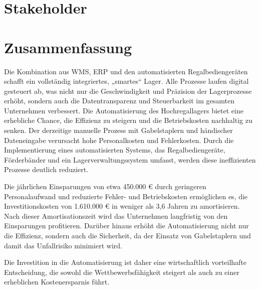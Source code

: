 \chapter{Stakeholder}
\chapter{Zusammenfassung}

Die Kombination aus WMS, ERP und den automatisierten Regalbediengeräten schafft ein vollständig integriertes, „smartes“ Lager. Alle Prozesse laufen digital gesteuert ab, was nicht nur die Geschwindigkeit und Präzision der Lagerprozesse erhöht, sondern auch die Datentransparenz und Steuerbarkeit im gesamten Unternehmen verbessert.
Die Automatisierung des Hochregallagers bietet eine erhebliche Chance, die Effizienz zu steigern und die Betriebskosten nachhaltig zu senken. Der derzeitige manuelle Prozess mit Gabelstaplern und händischer Dateneingabe verursacht hohe Personalkosten und Fehlerkosten. Durch die Implementierung eines automatisierten Systems, das Regalbediengeräte, Förderbänder und ein Lagerverwaltungssystem umfasst, werden diese ineffizienten Prozesse deutlich reduziert.

Die jährlichen Einsparungen von etwa 450.000 € durch geringeren Personalaufwand und reduzierte Fehler- und Betriebskosten ermöglichen es, die Investitionskosten von 1.610.000 € in weniger als 3,6 Jahren zu amortisieren. Nach dieser Amortisationszeit wird das Unternehmen langfristig von den Einsparungen profitieren. Darüber hinaus erhöht die Automatisierung nicht nur die Effizienz, sondern auch die Sicherheit, da der Einsatz von Gabelstaplern und damit das Unfallrisiko minimiert wird.

Die Investition in die Automatisierung ist daher eine wirtschaftlich vorteilhafte Entscheidung, die sowohl die Wettbewerbsfähigkeit steigert als auch zu einer erheblichen Kostenersparnis führt.



